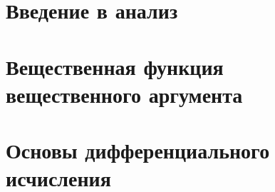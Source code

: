 \documentclass[a4paper,14pt]{report} %
\begin{document}
\newcommand{\pp}{Предположим противное}
\newcommand{\dokvo}{\paragraph{Доказательство.}}
\newcommand{\neobh}{\paragraph{Необходимость.}}
\newcommand{\dost }{\paragraph{Достаточность.}}
\newcommand{\opred}{\paragraph{Определение.}}
\newcommand{\N}{\mathbb{N}}
\newcommand{\Z}{\mathbb{Z}}
\newcommand{\Q}{\mathbb{Q}}
\newcommand{\R}{\mathbb{R}}
\renewcommand{\epsilon}{\varepsilon}
\newcommand{\fXR}{Пусть $X \subset \R, f:X \to \R$ }
\newcommand{\fXRx}{\fXR, $x_0$ - предельная точка $X$ }
\newcommand{\sgn}{\mathrm{sgn}~}

\tableofcontents %

\LARGE

\chapter{Введение в анализ}

\chapter{Вещественная функция вещественного аргумента}

\chapter{Основы дифференциального исчисления}

\end{document}

